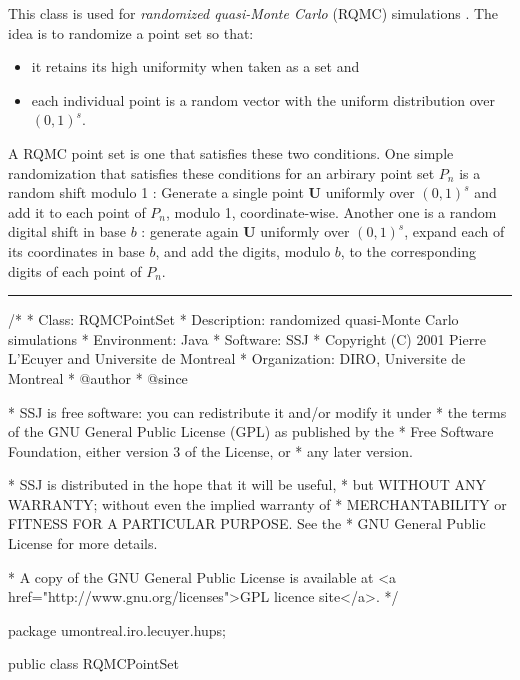 
This class is used for \emph{randomized quasi-Monte Carlo} (RQMC) simulations
\cite{vLEC00b,vLEC02a,vOWE97a,vOWE97b}.
 The idea is to randomize a point set so that:
\begin{itemize}
\item it retains its high uniformity when taken as a set and
\item each individual point is a random vector with the uniform
distribution over $(0, 1)^s$.
\end{itemize}
 A RQMC point set is one that satisfies these two conditions. One simple
randomization that satisfies these conditions for an arbirary point set $P_n$
  is a random shift modulo 1 \cite{vCRA76a,vLEC00b,vSLO94a}:
Generate a single point $\mathbf{U}$ uniformly over $(0, 1)^s$ and add it
 to each point of $P_n$, modulo 1, coordinate-wise.
Another one is a random digital shift in base $b$
 \cite{vLEC99a,vLEC02a,mMAT99a}: generate again $\mathbf{U}$ uniformly over
 $(0, 1)^s$, expand each of its coordinates in base $b$, and add the
digits, modulo $b$, to the corresponding digits of each point of $P_n$.
\bigskip\hrule\bigskip

\begin{code}
\begin{hide}
/*
 * Class:        RQMCPointSet
 * Description:  randomized quasi-Monte Carlo simulations
 * Environment:  Java
 * Software:     SSJ
 * Copyright (C) 2001  Pierre L'Ecuyer and Universite de Montreal
 * Organization: DIRO, Universite de Montreal
 * @author
 * @since

 * SSJ is free software: you can redistribute it and/or modify it under
 * the terms of the GNU General Public License (GPL) as published by the
 * Free Software Foundation, either version 3 of the License, or
 * any later version.

 * SSJ is distributed in the hope that it will be useful,
 * but WITHOUT ANY WARRANTY; without even the implied warranty of
 * MERCHANTABILITY or FITNESS FOR A PARTICULAR PURPOSE.  See the
 * GNU General Public License for more details.

 * A copy of the GNU General Public License is available at
   <a href="http://www.gnu.org/licenses">GPL licence site</a>.
 */
\end{hide}
package umontreal.iro.lecuyer.hups;

public class RQMCPointSet \begin{hide} {
   private PointSet set;
   private PointSetRandomization rand;
\end{hide}
\end{code}


